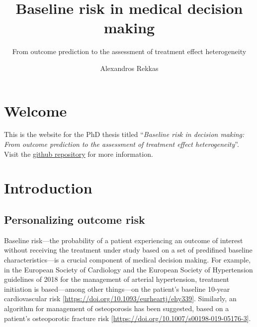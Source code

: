 \documentclass[
]{book}
\title{Baseline risk in medical decision making}
\subtitle{From outcome prediction to the assessment of treatment effect heterogeneity}
\author{Alexandros Rekkas}
\date{}
\begin{document}
\maketitle

{
\setcounter{tocdepth}{1}
\tableofcontents
}
\hypertarget{welcome}{%
\chapter*{Welcome}\label{welcome}}

This is the website for the PhD thesis titled ``\emph{Baseline risk in decision
making: From outcome prediction to the assessment of treatment effect
heterogeneity}''. Visit the \href{https://github.com/rekkasa/thesis}{github
repository} for more information.

\hypertarget{introduction}{%
\chapter{Introduction}\label{introduction}}

\hypertarget{personalizing-outcome-risk}{%
\section{Personalizing outcome risk}\label{personalizing-outcome-risk}}

Baseline risk---the probability of a patient experiencing an outcome of interest
without receiving the treatment under study based on a set of predifined
baseline characteristics---is a crucial component of medical decision making.
For example, in the European Society of Cardiology and the European Society of
Hypertension guidelines of 2018 for the management of arterial hypertension,
treatment initiation is based---among other things---on the patient's baseline
10-year cardiovascular risk
{[}\url{https://doi.org/10.1093/eurheartj/ehy339}{]}. Similarly, an algorithm for
management of osteoporosis has been suggested, based on a patient's osteoporotic
fracture risk {[}\url{https://doi.org/10.1007/s00198-019-05176-3}{]}.
\end{document}
